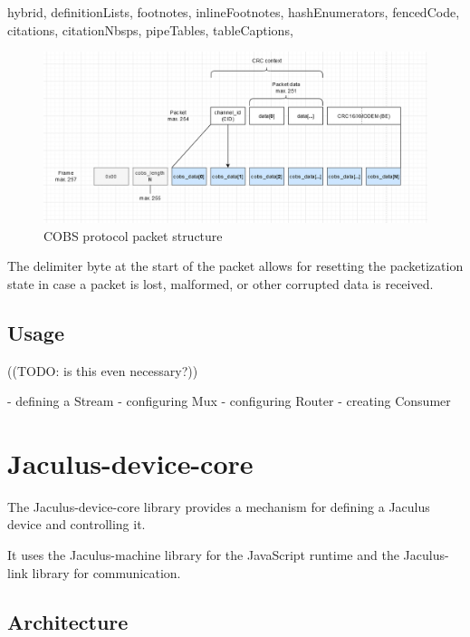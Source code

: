 \documentclass[
  digital,
  oneside,
  nosansbold,
  nocolorbold,
  lof,
  lot
]{fithesis4}
\begin{document}
\begin{markdown*}{%
  hybrid,
  definitionLists,
  footnotes,
  inlineFootnotes,
  hashEnumerators,
  fencedCode,
  citations,
  citationNbsps,
  pipeTables,
  tableCaptions,
}
\begin{figure}[ht]
    \centering
    \includegraphics[width=\textwidth]{cobs-diagram}
    \caption{COBS protocol packet structure}
    \label{fig:cobs-diagram}
\end{figure}

The delimiter byte at the start of the packet allows for resetting the packetization state in case a packet is lost, malformed, or other corrupted data is received.


\section{Usage}

((TODO: is this even necessary?))

  - defining a Stream
  - configuring Mux
  - configuring Router
  - creating Consumer


\chapter{Jaculus-device-core}

The Jaculus-device-core library provides a mechanism for defining a Jaculus device and controlling it.

It uses the Jaculus-machine library for the JavaScript runtime and the Jaculus-link library for communication.



\section{Architecture}


\end{markdown*}
\end{document}
